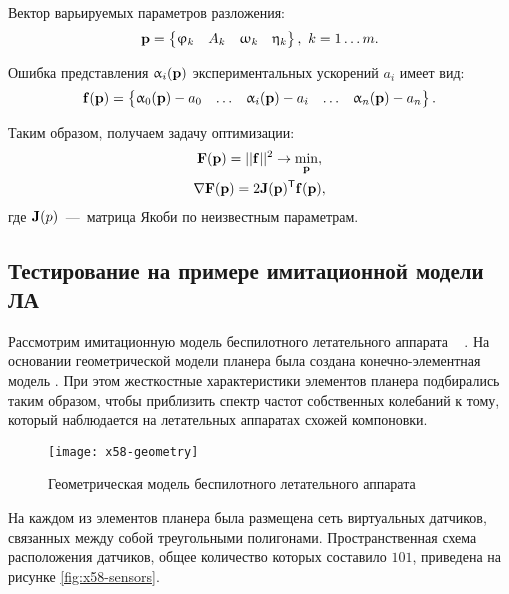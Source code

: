 Вектор варьируемых параметров разложения:
\begin{equation}
	\mathbf{p} = 
	\begin{Bmatrix}
		\upvarphi_k & A_k & \upomega_k & \upeta_k
	\end{Bmatrix}, \ k = 1 \hdots m.
\end{equation}

Ошибка представления $ \upalpha_i(\mathbf{p}) $ экспериментальных ускорений $ a_i $ имеет вид:
\begin{equation}
	\mathbf{f(\mathbf{p})} = 
	\begin{Bmatrix}
		\upalpha_0(\mathbf{p}) - a_0 & \hdots & \upalpha_i(\mathbf{p}) - a_i & \hdots & \upalpha_n(\mathbf{p}) - a_n
	\end{Bmatrix}.
\end{equation}

Таким образом, получаем задачу оптимизации:
\begin{equation}
	\begin{gathered}
		\mathbf{F}(\mathbf{p}) = \vert \vert \mathbf{f} \vert \vert ^ 2 \rightarrow \min_{\mathbf{p}}, \\
		\nabla \mathbf{F(\mathbf{p})} = 2 \mathbf{J}(\mathbf{p}) ^ \mathsf{T} \mathbf{f(\mathbf{p})},
	\end{gathered}
\end{equation}
где $ \mathbf{J}(p) $~---~матрица Якоби по неизвестным параметрам.

\subsection{Тестирование на примере имитационной модели ЛА}

Рассмотрим имитационную модель беспилотного летательного аппарата ~ \cite{lib:misc:x58}. На основании геометрической модели планера была создана конечно-элементная модель  . При этом жесткостные характеристики элементов планера подбирались таким образом, чтобы приблизить спектр частот собственных колебаний к тому, который наблюдается на летательных аппаратах схожей компоновки.

\begin{figure}[!htb]
	\centerfloat
	\texttt{[image: x58-geometry]}
	\caption{Геометрическая модель беспилотного летательного аппарата} \label{fig:x58-geometry}
\end{figure}

На каждом из элементов планера была размещена сеть виртуальных датчиков, связанных между собой треугольными полигонами. Пространственная схема расположения датчиков, общее количество которых составило $ 101 $, приведена на рисунке \ref{fig:x58-sensors}.

